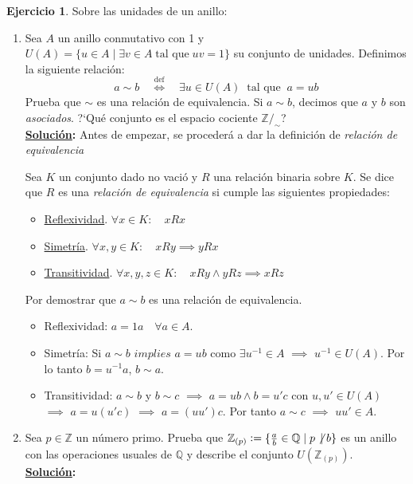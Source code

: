 \documentclass[11pt,letterpaper]{article}
\theoremstyle{definition}\newtheorem{p}{Ejercicio}
\theoremstyle{definition}\newtheorem{pp}[p]{$(*)$Ejercicio}
\numberwithin{p}{section}
\newcommand{\Z}{\mathbb{Z}}
\newcommand{\Q}{\mathbb{Q}}
\newcommand{\sii}{\Longleftrightarrow}
\newcommand{\sol}{\textbf{\underline{Solución}: }} %
\begin{document}
\begin{p} Sobre las unidades de un anillo:
  \begin{enumerate}
  \item Sea $A$ un anillo conmutativo con 1 y
    $U(A)=\{u\in A\mid \exists v\in A\;\text{tal que}\; uv=1\}$ su conjunto de unidades. Definimos la
    siguiente relaci\'on:
    \[
      a\sim b \quad\stackrel{\text{def}}{\sii}\quad \exists u\in U(A)\;\;\text{tal que}\;\; a=ub
    \]
    Prueba que $\sim$ es una relaci\'on de equivalencia. Si $a\sim b$, decimos que $a$ y $b$ son
    \emph{asociados}. ?`Qu\'e conjunto es el espacio cociente $\Z/_{\sim}$?\\
    \sol Antes de empezar, se procederá a dar la definición de \emph{relación de equivalencia}
    \begin{definition}
    Sea $K$ un conjunto dado no vació y $R$ una relación binaria sobre $K$. Se dice que $R$ 
    es una \emph{relación de equivalencia} si cumple las siguientes propiedades:
        \begin{itemize}
        \item \underline{Reflexividad}. $\forall x \in K : \quad xRx$
        \item \underline{Simetría}. $\forall x,y \in K : \quad xRy \implies yRx$
        \item \underline{Transitividad}. $\forall x,y,z \in K : \quad xRy \land yRz\implies xRz$
        \end{itemize}
    \end{definition}
    Por demostrar que $a\sim b$ es una relación de equivalencia.
    \begin{itemize}
        \item Reflexividad: $a=1a \quad \forall a \in A$.
        \item Simetría: Si $a \sim b$ $implies$ $a=ub$ como $\exists u^{-1} \in A$ 
        $\implies$ $u^{-1} \in U(A)$. Por lo tanto $b=u^{-1}a$, $b \sim a$.
        \item Transitividad: $a \sim b$ y $b \sim c$ $\implies$ $a=ub \land b=u'c$ 
        con $u, u' \in U(A)$ $\implies$ $a=u(u'c)$ $\implies$ $a=(uu')c$. 
        Por tanto $a \sim c$ $\implies$ $uu' \in A$.  
    \end{itemize}
    
  \item Sea $p\in\Z$ un n\'umero primo. Prueba que $\Z_{(p)}:=\{\frac{a}{b}\in\Q\mid p\not\,\mid b\}$
    es un anillo con las operaciones usuales de $\Q$ y describe el conjunto $U(\Z_{(p)})$.\\
  \sol 
    

\end{enumerate}
\end{p}
\end{document}
